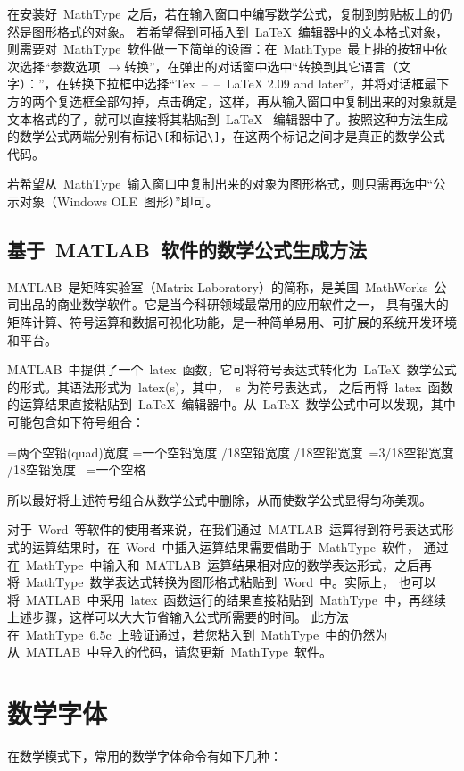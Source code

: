 在安装好~MathType~之后，若在输入窗口中编写数学公式，复制到剪贴板上的仍然是图形格式的对象。
若希望得到可插入到~\LaTeX~编辑器中的文本格式对象，则需要对~MathType~软件做一下简单的设置：在~MathType~最上排的按钮中依次选择“参数选项
$\to$转换”，在弹出的对话窗中选中“转换到其它语言（文字）：”，在转换下拉框中选择“Tex~--~--~LaTeX 2.09 and later”，并将对话框最下方的两个复选框全部勾掉，点击确定，这样，再从输入窗口中复制出来的对象就是文本格式的了，就可以直接将其粘贴到~\LaTeX~
编辑器中了。按照这种方法生成的数学公式两端分别有标记\verb|\[|和标记\verb|\]|，在这两个标记之间才是真正的数学公式代码。

若希望从~MathType~输入窗口中复制出来的对象为图形格式，则只需再选中“公示对象（Windows OLE~图形）”即可。

\subsection{基于~MATLAB~软件的数学公式生成方法}

MATLAB~是矩阵实验室（Matrix Laboratory）的简称，是美国~MathWorks~公司出品的商业数学软件。它是当今科研领域最常用的应用软件之一，
具有强大的矩阵计算、符号运算和数据可视化功能，是一种简单易用、可扩展的系统开发环境和平台。

MATLAB~中提供了一个~latex~函数，它可将符号表达式转化为~\LaTeX~数学公式的形式。其语法形式为~latex(s)，其中，~s~为符号表达式，
之后再将~latex~函数的运算结果直接粘贴到~\LaTeX~编辑器中。从~\LaTeX~数学公式中可以发现，其中可能包含如下符号组合：

\begin{verbatim*}
\qquad=两个空铅(quad)宽度
\quad=一个空铅宽度
/18空铅宽度
/18空铅宽度
\,=3/18空铅宽度
/18空铅宽度
\ =一个空格
\end{verbatim*}

所以最好将上述符号组合从数学公式中删除，从而使数学公式显得匀称美观。

对于~Word~等软件的使用者来说，在我们通过~MATLAB~运算得到符号表达式形式的运算结果时，在~Word~中插入运算结果需要借助于~MathType~软件，
通过在~MathType~中输入和~MATLAB~运算结果相对应的数学表达形式，之后再将~MathType~数学表达式转换为图形格式粘贴到~Word~中。实际上，
也可以将~MATLAB~中采用~latex~函数运行的结果直接粘贴到~MathType~中，再继续上述步骤，这样可以大大节省输入公式所需要的时间。
此方法在~MathType~6.5c~上验证通过，若您粘入到~MathType~中的仍然为从~MATLAB~中导入的代码，请您更新~MathType~软件。

\section{数学字体}
在数学模式下，常用的数学字体命令有如下几种：

